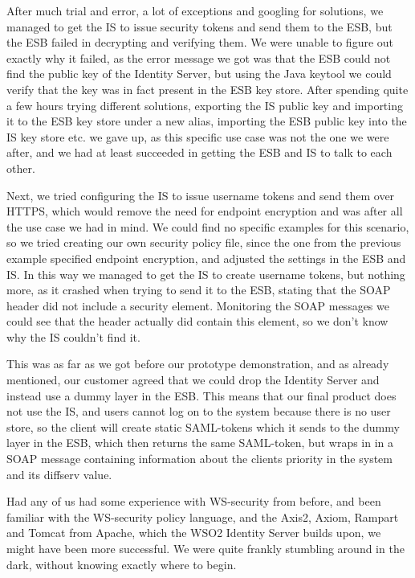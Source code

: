     After much trial and error, a lot of exceptions and googling for solutions, we managed to get the IS to issue security tokens and send them to the ESB, but the ESB failed in decrypting and verifying them. We were unable to figure out exactly why it failed, as the error message we got was that the ESB could not find the public key of the Identity Server, but using the Java keytool we could verify that the key was in fact present in the ESB key store. After spending quite a few hours trying different solutions, exporting the IS public key and importing it to the ESB key store under a new alias, importing the ESB public key into the IS key store etc. we gave up, as this specific use case was not the one we were after, and we had at least succeeded in getting the ESB and IS to talk to each other.

    Next, we tried configuring the IS to issue username tokens and send them over HTTPS, which would remove the need for endpoint encryption and was after all the use case we had in mind. We could find no specific examples for this scenario, so we tried creating our own security policy file, since the one from the previous example specified endpoint encryption, and adjusted the settings in the ESB and IS. In this way we managed to get the IS to create username tokens, but nothing more, as it crashed when trying to send it to the ESB, stating that the SOAP header did not include a security element. Monitoring the SOAP messages we could see that the header actually did contain this element, so we don't know why the IS couldn't find it.

    This was as far as we got before our prototype demonstration, and as already mentioned, our customer agreed that we could drop the Identity Server and instead use a dummy layer in the ESB. This means that our final product does not use the IS, and users cannot log on to the system because there is no user store, so the client will create static SAML-tokens which it sends to the dummy layer in the ESB, which then returns the same SAML-token, but wraps in in a SOAP message containing information about the clients priority in the system and its diffserv value.

    Had any of us had some experience with WS-security from before, and been familiar with the WS-security policy language, and the Axis2, Axiom, Rampart and Tomcat from Apache, which the WSO2 Identity Server builds upon,  we might have been more successful. We were quite frankly stumbling around in the dark, without knowing exactly where to begin.






